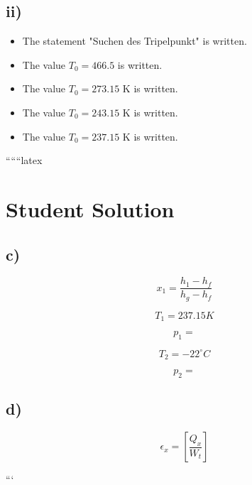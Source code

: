 \subsection*{ii)}

\begin{itemize}
    \item The statement "Suchen des Tripelpunkt" is written.
    \item The value $T_0 = 466.5$ is written.
    \item The value $T_0 = 273.15 \text{ K}$ is written.
    \item The value $T_0 = 243.15 \text{ K}$ is written.
    \item The value $T_0 = 237.15 \text{ K}$ is written.
\end{itemize}

``````latex


\section*{Student Solution}

\subsection*{c)}

\[
x_1 = \frac{h_1 - h_f}{h_g - h_f}
\]

\[
T_1 = 237.15 K
\]

\[
p_1 = 
\]

\[
T_2 = -22^\circ C
\]

\[
p_2 = 
\]

\subsection*{d)}

\[
\epsilon_x = \left[ \frac{Q_x}{W_t} \right]
\]

```